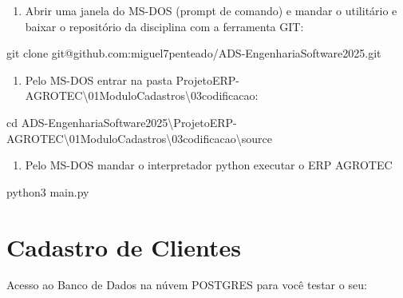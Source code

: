 \documentclass[
]{book}
\newenvironment{Shaded}{\begin{snugshade}}{\end{snugshade}}
\newcommand{\AttributeTok}[1]{\textcolor[rgb]{0.13,0.29,0.53}{#1}}
\newcommand{\BuiltInTok}[1]{#1}
\newcommand{\NormalTok}[1]{#1}
\providecommand{\tightlist}{%
  \setlength{\itemsep}{0pt}\setlength{\parskip}{0pt}}
\begin{document}
\begin{enumerate}
\def\labelenumi{\arabic{enumi}.}
\setcounter{enumi}{2}
\tightlist
\item
  Abrir uma janela do MS-DOS (prompt de comando) e mandar o utilitário e baixar o repositório da disciplina com a ferramenta GIT:
\end{enumerate}

\begin{Shaded}
\begin{Highlighting}[]
\NormalTok{git clone git@github.com:miguel7penteado}\AttributeTok{/ADS{-}EngenhariaSoftware2025}\NormalTok{.git}
\end{Highlighting}
\end{Shaded}

\begin{enumerate}
\def\labelenumi{\arabic{enumi}.}
\setcounter{enumi}{3}
\tightlist
\item
  Pelo MS-DOS entrar na pasta ProjetoERP-AGROTEC\textbackslash01ModuloCadastros\textbackslash03codificacao\source :
\end{enumerate}

\begin{Shaded}
\begin{Highlighting}[]
\BuiltInTok{cd}\NormalTok{ ADS{-}EngenhariaSoftware2025\textbackslash{}ProjetoERP{-}AGROTEC\textbackslash{}01ModuloCadastros\textbackslash{}03codificacao\textbackslash{}source}
\end{Highlighting}
\end{Shaded}

\begin{enumerate}
\def\labelenumi{\arabic{enumi}.}
\setcounter{enumi}{4}
\tightlist
\item
  Pelo MS-DOS mandar o interpretador python executar o ERP AGROTEC
\end{enumerate}

\begin{Shaded}
\begin{Highlighting}[]
\NormalTok{python3 main.py}
\end{Highlighting}
\end{Shaded}

\section{Cadastro de Clientes}\label{cadastro-de-clientes}

Acesso ao Banco de Dados na núvem POSTGRES para você testar o seu:
\end{document}

